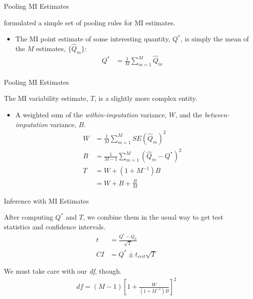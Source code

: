 \documentclass{beamer}\usepackage[]{graphicx}\usepackage[]{color}
\begin{document}
\begin{frame}{Pooling MI Estimates}
  
  \citet{rubin:1987} formulated a simple set of pooling rules for MI estimates.
  \vb
  \begin{itemize}
  \item The MI point estimate of some interesting quantity, $Q^*$, is simply 
    the mean of the $M$ estimates, $\{\hat{Q}_m\}$:
    \begin{align*}
      Q^* &= \frac{1}{M} \sum_{m = 1}^M \hat{Q}_m\\
    \end{align*}
  \end{itemize}
  
\end{frame}


\begin{frame}{Pooling MI Estimates}
  
  The MI variability estimate, $T$, is a slightly more complex entity.
  \vb
  \begin{itemize}
  \item A weighted sum of the \emph{within-imputation} variance, $W$, and the 
    \emph{between-imputation} variance, $B$.
    \begin{align*}
      W &= \frac{1}{M} \sum_{m = 1}^M SE(\hat{Q}_m)^2\\
      B &= \frac{1}{M - 1} \sum_{m = 1}^M \left( \hat{Q}_m - Q^* \right)^2\\
      T &= W + \left( 1 + M^{-1} \right) B\\ 
      &= W + B + \frac{B}{M}
    \end{align*}
  \end{itemize}
  
\end{frame}


\begin{frame}{Inference with MI Estimates}
  
  After computing $Q^*$ and $T$, we combine them in the usual way to get test 
  statistics and confidence intervals.
  \begin{align*}
    t &= \frac{Q^* - Q_0}{\sqrt{T}}\\
    CI &= Q^* \pm t_{crit} \sqrt{T}
  \end{align*}
  
  We must take care with our \emph{df}, though.
  \begin{align*}
    df = (M - 1) \left[1 + \frac{W}{\left(1 + M^{-1}\right)B}\right]^2
  \end{align*}
  
\end{frame}
\end{document}
